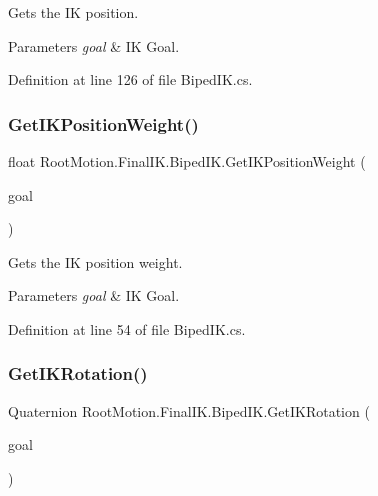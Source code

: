 Gets the IK position. 


\begin{DoxyParams}{Parameters}
{\em goal} & IK Goal. \\
\hline
\end{DoxyParams}


Definition at line 126 of file Biped\+I\+K.\+cs.

\mbox{\label{class_root_motion_1_1_final_i_k_1_1_biped_i_k_a799c6c6550864c98a8b753d46ca253bf}} 
\subsubsection{\texorpdfstring{Get\+I\+K\+Position\+Weight()}{GetIKPositionWeight()}}
{\footnotesize\ttfamily float Root\+Motion.\+Final\+I\+K.\+Biped\+I\+K.\+Get\+I\+K\+Position\+Weight (\begin{DoxyParamCaption}\item[{Avatar\+I\+K\+Goal}]{goal }\end{DoxyParamCaption})}



Gets the IK position weight. 


\begin{DoxyParams}{Parameters}
{\em goal} & IK Goal. \\
\hline
\end{DoxyParams}


Definition at line 54 of file Biped\+I\+K.\+cs.

\mbox{\label{class_root_motion_1_1_final_i_k_1_1_biped_i_k_a0b96941b5a4e0435d44a4aafbd738f53}} 
\subsubsection{\texorpdfstring{Get\+I\+K\+Rotation()}{GetIKRotation()}}
{\footnotesize\ttfamily Quaternion Root\+Motion.\+Final\+I\+K.\+Biped\+I\+K.\+Get\+I\+K\+Rotation (\begin{DoxyParamCaption}\item[{Avatar\+I\+K\+Goal}]{goal }\end{DoxyParamCaption})}



